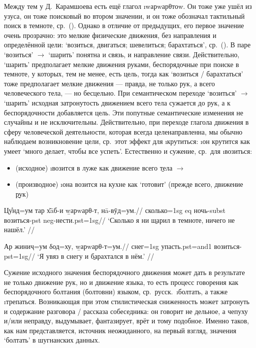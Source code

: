 Между тем у Д.~Карамшоева есть ещё глагол \i{wарwарθтоw}. Он тоже уже ушёл из узуса, он тоже поисковый во втором значении, и он тоже обозначал тактильный поиск в темноте, ср.~(). Однако в отличие от предыдущих, его первое значение очень прозрачно: это мелкие физические движения, без направления и определённой цели: ‘возиться, двигаться; шевелиться; барахтаться’, ср.~(). В паре ‘возиться’ $\rightarrow$ ‘шарить’ понятна и связь, и направление связи. Действительно, ‘шарить’ предполагает мелкие движения руками, беспорядочные при поиске в темноте, у которых, тем не менее, есть цель, тогда как ‘возиться / барахтаться’ тоже предполагает мелкие движения — правда, не только рук, а всего человеческого тела, — но бесцельно. При семантическом переходе ‘возиться’ $\rightarrow$ ‘шарить’ исходная затронутость движением всего тела сужается до рук, а к беспорядочности добавляется цель. Эти попутные семантические изменения не случайны и не исключительны. Действительно, при переходе глагола движения в сферу человеческой деятельности, которая всегда целенаправленна, мы обычно наблюдаем возникновение цели, ср.~этот эффект для \i{крутиться}: \i{он крутится как умеет} ‘много делает, чтобы все успеть’. Естественно и сужение, ср.~для \i{возиться}:

\begin{itemize}
  \item (исходное) \i{возится в луже} как движение всего \b{тела} $\rightarrow$
  \item (производное) \i{она возится на кухне} как ‘готовит’ (прежде всего, движение \b{рук})
\end{itemize}

\begingl
\gla Цу̊нд=ум тар х̌āб-и \b{wарwарθ-т}, нā-вӯд=ум.//
\glc сколько={\sc 1sg} {\sc eq} ночь-{\sc subst} возиться-{\sc pst} {\sc neg}-нести.{\sc pst=1sg}//
\glft ‘Сколько я ни \b{шарил} в темноте, ничего не нашёл.’ //
\endgl \xe

\begingl
\gla Ар жиниҷ=ум δод=ху, \b{wарwарθ-т}=ум.//
 снег={\sc 1sg} упасть.{\sc pst=and1} возиться-{\sc pst=1sg}//
\glft ‘Я увяз в снегу и \b{барахтался} в нём.’ //
\endgl \xe

Сужение исходного значения беспорядочного движения может дать в результате не только движение рук, но и движение языка, то есть процесс говорения как беспорядочного болтания (болтовни) языком, ср.~русск.~\i{болтать}, а также \i{трепаться}. Возникающая при этом стилистическая сниженность может затронуть и содержание разговора / рассказа собеседника: он говорит не дельное, а чепуху и/или неправду, выдумывает, фантазирует, врёт и тому подобное. Именно таков, как нам представляется, источник неожиданного, на первый взгляд, значения ‘болтать’ в шугнанских данных.

